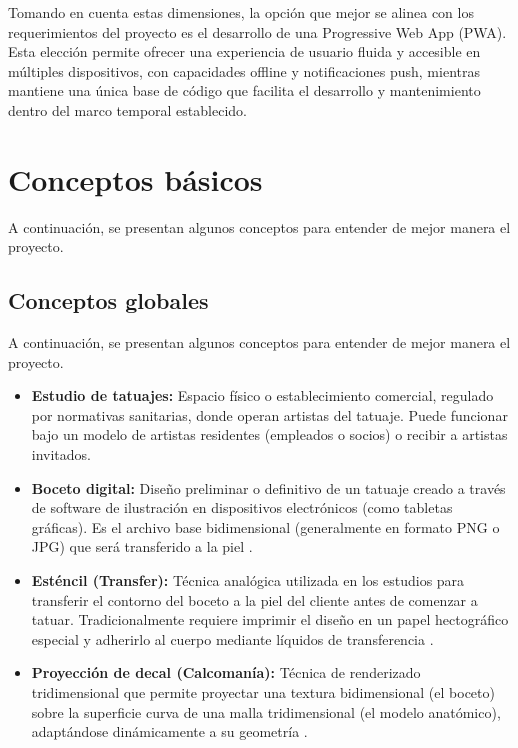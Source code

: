 Tomando en cuenta estas dimensiones, la opción que mejor se alinea con los requerimientos del proyecto es el desarrollo de una Progressive Web App (PWA). Esta elección permite ofrecer una experiencia de usuario fluida y accesible en múltiples dispositivos, con capacidades offline y notificaciones push, mientras mantiene una única base de código que facilita el desarrollo y mantenimiento dentro del marco temporal establecido.

\section{Conceptos básicos}

A continuación, se presentan algunos conceptos para entender de mejor manera el proyecto.

\subsection{Conceptos globales }

A continuación, se presentan algunos conceptos para entender de mejor manera el proyecto.

\begin{itemize}
  \item \textbf{Estudio de tatuajes:} Espacio físico o establecimiento comercial, regulado por normativas sanitarias, donde operan artistas del tatuaje. Puede funcionar bajo un modelo de artistas residentes (empleados o socios) o recibir a artistas invitados.

  \item \textbf{Boceto digital:} Diseño preliminar o definitivo de un tatuaje creado a través de software de ilustración en dispositivos electrónicos (como tabletas gráficas). Es el archivo base bidimensional (generalmente en formato PNG o JPG) que será transferido a la piel \cite{baguena2008}.

  \item \textbf{Esténcil (Transfer):} Técnica analógica utilizada en los estudios para transferir el contorno del boceto a la piel del cliente antes de comenzar a tatuar. Tradicionalmente requiere imprimir el diseño en un papel hectográfico especial y adherirlo al cuerpo mediante líquidos de transferencia \cite{jordan2009}.

  \item \textbf{Proyección de decal (Calcomanía):} Técnica de renderizado tridimensional que permite proyectar una textura bidimensional (el boceto) sobre la superficie curva de una malla tridimensional (el modelo anatómico), adaptándose dinámicamente a su geometría \cite{akenine2018}.
\end{itemize}

